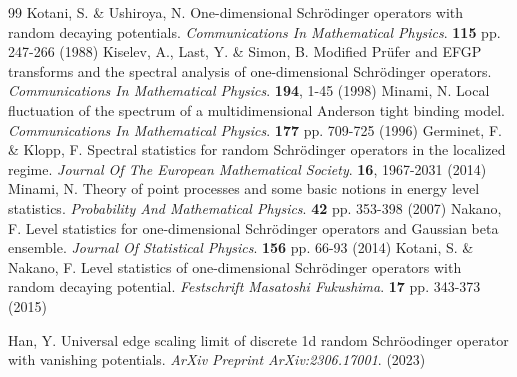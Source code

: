\documentclass[12pt, reqno]{amsart}
\theoremstyle{definition}
\theoremstyle{remark}
\numberwithin{equation}{section}
\begin{document}
\begin{thebibliography}{99}
Kotani, S. \& Ushiroya, N. One-dimensional Schrödinger operators with random decaying potentials. {\em Communications In Mathematical Physics}. \textbf{115} pp. 247-266 (1988)
Kiselev, A., Last, Y. \& Simon, B. Modified Prüfer and EFGP transforms and the spectral analysis of one-dimensional Schrödinger operators. {\em Communications In Mathematical Physics}. \textbf{194}, 1-45 (1998)
Minami, N. Local fluctuation of the spectrum of a multidimensional Anderson tight binding model. {\em Communications In Mathematical Physics}. \textbf{177} pp. 709-725 (1996)
Germinet, F. \& Klopp, F. Spectral statistics for random Schrödinger operators in the localized regime. {\em Journal Of The European Mathematical Society}. \textbf{16}, 1967-2031 (2014)
Minami, N. Theory of point processes and some basic notions in energy level statistics. {\em Probability And Mathematical Physics}. \textbf{42} pp. 353-398 (2007)
Nakano, F. Level statistics for one-dimensional Schrödinger operators and Gaussian beta ensemble. {\em Journal Of Statistical Physics}. \textbf{156} pp. 66-93 (2014)
Kotani, S. \& Nakano, F. Level statistics of one-dimensional Schrödinger operators with random decaying potential. {\em Festschrift Masatoshi Fukushima}. \textbf{17} pp. 343-373 (2015)

Han, Y. Universal edge scaling limit of discrete 1d random Schröodinger operator with vanishing potentials. {\em ArXiv Preprint ArXiv:2306.17001}. (2023)




\end{thebibliography}
\end{document}
